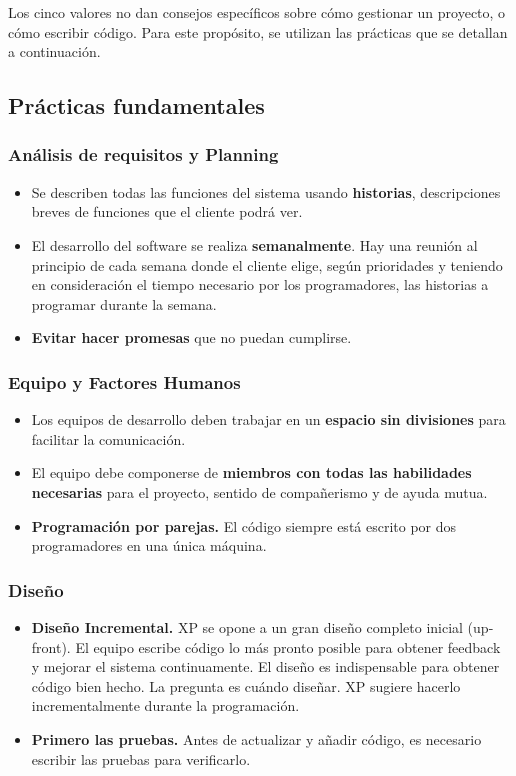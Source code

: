 Los cinco valores no dan consejos específicos sobre cómo gestionar un proyecto, o cómo 
escribir código. Para este propósito, se utilizan las prácticas que se detallan a continuación.

\subsection{Prácticas fundamentales}
\subsubsection{Análisis de requisitos y Planning}
\begin{itemize}
\item Se describen todas las funciones del sistema usando \textbf{historias}, descripciones breves de funciones que el cliente podrá ver.
\item El desarrollo del software se realiza \textbf{semanalmente}. Hay una reunión al principio de cada semana donde el cliente elige, según prioridades y teniendo en consideración el tiempo necesario por los programadores, las historias a programar durante la semana.
\item \textbf{Evitar hacer promesas} que no puedan cumplirse. 
\end{itemize}

\subsubsection{Equipo y Factores Humanos}
\begin{itemize}
\item Los equipos de desarrollo deben trabajar en un \textbf{espacio sin divisiones} para facilitar la comunicación.
\item El equipo debe componerse de \textbf{miembros con todas las habilidades necesarias} para el proyecto, sentido de compañerismo y de ayuda mutua. 
\item \textbf{Programación por parejas.} El código siempre está escrito por dos programadores en una única máquina.
\end{itemize}

\subsubsection{Diseño}
\begin{itemize}
\item \textbf{Diseño Incremental.} XP se opone a un gran diseño completo inicial (up-front). El equipo escribe código lo más pronto posible para obtener feedback y mejorar el sistema continuamente. El diseño es indispensable para obtener código bien hecho. La pregunta es cuándo diseñar. XP sugiere hacerlo incrementalmente durante la programación.
\item \textbf{Primero las pruebas.} Antes de actualizar y añadir código, es necesario escribir las pruebas para verificarlo. 
\end{itemize}
